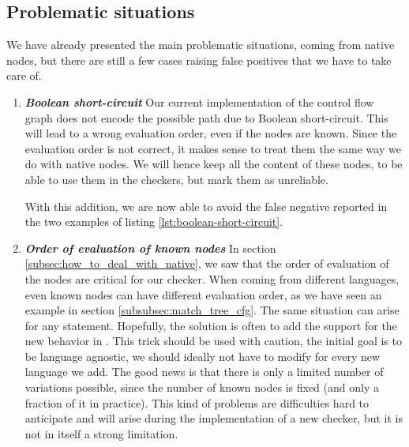 \subsection{Problematic situations}
\label{subsec:other_problematic_situation}
	
We have already presented the main problematic situations, coming from native nodes, but there are still a few cases raising false positives that we have to take care of.

\begin{enumerate}
	\item \textbf{\textit{Boolean short-circuit}} \newline 
	\label{subsubsec:boolean_short_circuit}
	Our current implementation of the control flow graph does not encode the possible path due to Boolean short-circuit. 
	This will lead to a wrong evaluation order, even if the nodes are known. 
	Since the evaluation order is not correct, it makes sense to treat them the same way we do with native nodes.
	We will hence keep all the content of these nodes, to be able to use them in the checkers, but mark them as unreliable. 


	
	With this addition, we are now able to avoid the false negative reported in the two examples of listing \ref{lst:boolean-short-circuit}.
	
	\item \textbf{\textit{Order of evaluation of known nodes}} \newline 
	\label{subsubsec:evaluation_known_nodes}
	In section \ref{subsec:how_to_deal_with_native}, we saw that the order of evaluation of the nodes are critical for our checker.
	When coming from different languages, even known nodes can have different evaluation order, as we have seen an example in section \ref{subsubsec:match_tree_cfg}. 
	The same situation can arise for any statement.
	Hopefully, the solution is often to add the support for the new behavior in \slang{}.
	This trick should be used with caution, the initial goal is to be language agnostic, we should ideally not have to modify \slang{} for every new language we add. 
	The good news is that there is only a limited number of variations possible, since the number of known nodes is fixed (and only a fraction of it in practice). 
	This kind of problems are difficulties hard to anticipate and will arise during the implementation of a new checker, but it is not in itself a strong limitation.
	

\end{enumerate}
